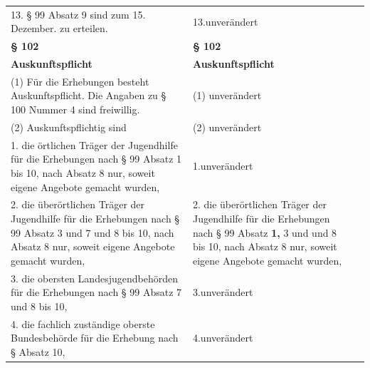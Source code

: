 \documentclass[10pt,a4paper,landscape]{article}
\begin{document}
\begin{longtable}{|L{8.2cm}|L{8.2cm}|L{8.2cm}|}
\hhline{|---|}
13.   \newline \S{} 99 Absatz 9 sind zum 15. Dezember. zu  \newline erteilen. & 13.unverändert &  \\
\hhline{|---|}
\textbf{\S{} 102} & \textbf{\S{} 102} &  \\
\hhline{|---|}
\textbf{Auskunftspflicht } & \textbf{Auskunftspflicht } &  \\
\hhline{|---|}
(1) Für die Erhebungen besteht  \newline Auskunftspflicht. Die Angaben zu \S{} 100  \newline Nummer 4 sind freiwillig. & (1) unverändert &  \\
\hhline{|---|}
(2) Auskunftspflichtig sind & (2) unverändert &  \\
\hhline{|---|}
1.   \newline die örtlichen Träger der Jugendhilfe für die  \newline Erhebungen nach \S{} 99 Absatz 1 bis 10,  \newline nach Absatz 8 nur, soweit eigene Angebote  \newline gemacht wurden, & 1.unverändert &  \\
\hhline{|---|}
2.   \newline die überörtlichen Träger der Jugendhilfe für  \newline die Erhebungen nach \S{} 99 Absatz 3 und 7  \newline und 8 bis 10, nach Absatz 8 nur, soweit  \newline eigene Angebote gemacht wurden, & 2.   \newline die überörtlichen Träger der Jugendhilfe für  \newline die Erhebungen nach \S{} 99 Absatz \textbf{\textcolor{diffred}{1,}} 3 und   und 8 bis 10, nach Absatz 8 nur, soweit  \newline eigene Angebote gemacht wurden, &  \\
\hhline{|---|}
3.   \newline die obersten Landesjugendbehörden für  \newline die Erhebungen nach \S{} 99 Absatz 7 und 8  \newline bis 10, & 3.unverändert &  \\
\hhline{|---|}
4.   \newline die fachlich zuständige oberste  \newline Bundesbehörde für die Erhebung nach \S{}   Absatz 10, & 4.unverändert &  \\

\end{longtable}
\end{document}
